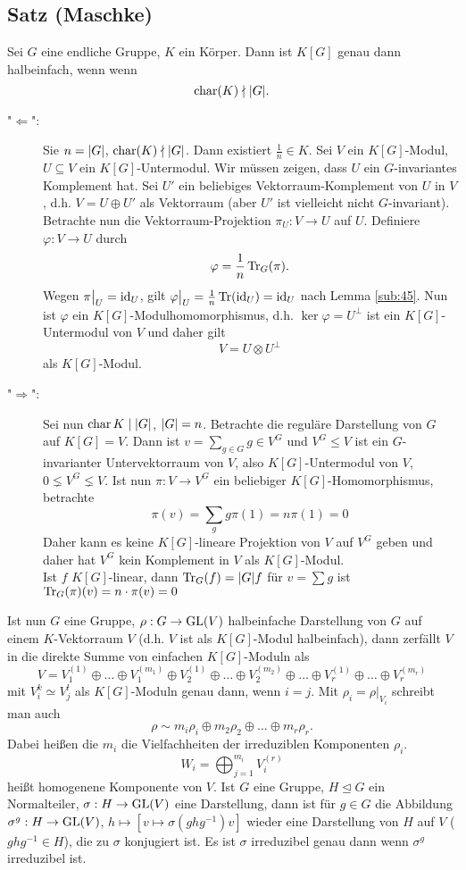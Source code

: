 \subsection{Satz (Maschke)} %
\label{sub:46}
Sei $G$ eine endliche Gruppe, $K$ ein Körper. Dann ist $K[G]$ genau dann halbeinfach, wenn wenn 
\[
	\Char(K) \nmid \abs*{G}.
\]
\begin{description}
	\item["$\Leftarrow$":] Sie $n= \abs*{G}$, $\Char(K) \nmid \abs*{G}$. Dann existiert $\frac{1}{n} \in K$. Sei $V$ ein $K[G]$-Modul, $U \subseteq V$ ein $K[G]$-Untermodul.
	Wir müssen zeigen, dass $U$ ein $G$-invariantes Komplement hat. Sei $U'$ ein beliebiges Vektorraum-Komplement von $U$ in $V$, d.h. $V= U \oplus U'$ als Vektorraum (aber
	$U'$ ist vielleicht nicht $G$-invariant). Betrachte nun die Vektorraum-Projektion $\pi_U : V \to U$ auf $U$. Definiere $\varphi : V \to U$ durch
	\[
		\varphi = \frac{1}{n} \Tr_G(\pi) .
	\]
	Wegen $\pi\big|_U = \id_U$, gilt $\varphi\big|_{U} = \frac{1}{n} \Tr(\id_U) = \id_U$ nach Lemma \ref{sub:45}. Nun ist $\varphi$ ein $K[G]$-Modulhomomorphismus, d.h.
	$\ker \varphi = U^\bot$ ist ein $K[G]$-Untermodul von $V$ und daher gilt
	\[
		V = U \otimes  U^\bot
	\]
	als $K[G]$-Modul.
	\item["$\Rightarrow$":] Sei nun $\Char K \mid \abs*{G}$, $\abs*{G} = n$. Betrachte die reguläre Darstellung von $G$ auf $K[G]=V$. Dann ist $v = \sum_{g \in G} g \in V^G$
	und $V^G \le V$ ist ein $G$-invarianter Untervektorraum von $V$, also $K[G]$-Untermodul von $V$, $0 \lneq V^G \lneq V$. Ist nun $\pi : V \to V^G$ ein beliebiger 
	$K[G]$-Homomorphismus, betrachte 
	\[
		\pi(v) = \sum_g g \pi(1) = n \pi(1) = 0
	\]
	Daher kann es keine $K[G]$-lineare Projektion von $V$ auf $V^G$ geben und daher hat $V^G$ kein Komplement in $V$ als $K[G]$-Modul. \bewende \\
	Ist $f$ $K[G]$-linear, dann $\Tr_G(f) = \abs*{G} f $ für $v = \sum g$ ist $\Tr_G(\pi )(v) = n \cdot \pi(v) = 0$ 
\end{description}
Ist nun $G$ eine Gruppe, $\rho : G \to \GL(V)$ halbeinfache Darstellung von $G$ auf einem $K$-Vektorraum $V$ (d.h. $V$ ist als $K[G]$-Modul halbeinfach), dann zerfällt $
V$ in die direkte Summe von einfachen $K[G]$-Moduln als 
\[
	V = V_1^{(1)} \oplus \ldots \oplus V_1^{(m_1)} \oplus V_2^{(1)} \oplus \ldots \oplus V_2^{(m_2)} \oplus  \ldots  \oplus V_r^{(1)} \oplus \ldots \oplus V_r^{(m_r)}
\]
mit $V_i^{k} \simeq V_j^{l}$ als $K[G]$-Moduln genau dann, wenn $i=j$. Mit $\rho_i = \rho \big|_{V_i}$ schreibt man auch
\[
	\rho \sim m_i \rho_i \oplus m_2 \rho_2 \oplus \ldots \oplus m_r \rho_r.
\]
Dabei heißen die $m_i$ die Vielfachheiten der irreduziblen Komponenten $\rho_i$.
\[
	W_i = \bigoplus_{j=1}^{m_i} V_i^{(r)}
\]
heißt homogenene Komponente von $V$. Ist $G$ eine Gruppe, $H \unlhd G$ ein Normalteiler, $\sigma : H \to \GL(V)$ eine Darstellung, dann ist für $g \in G$ die 
Abbildung $\sigma^g : H \to \GL(V)$, $h \mapsto [v \mapsto \sigma(g h g ^{-1}) v]$ wieder eine Darstellung von $H$ auf $V$ ($g h g ^{-1} \in H$), die zu $\sigma$ 
konjugiert ist. Es ist $\sigma$ irreduzibel genau dann wenn $\sigma^g$ irreduzibel ist.


